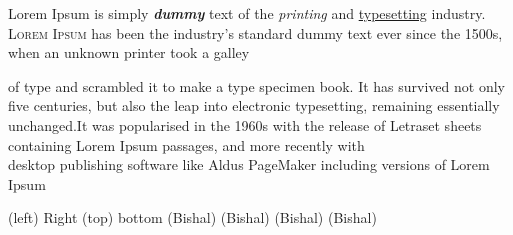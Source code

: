 \documentclass[12pt,a4paper]{article}
\begin{document}
\setlength{\parindent}{30pt}
Lorem Ipsum is simply \textbf{\textit{dummy}} text of the \textit{printing} and \underline{typesetting} industry. \textsc{Lorem Ipsum} has been the industry's \textmd{standard} dummy text ever since the 1500s, when an unknown printer took a galley  
\vfill

of type and scrambled it to make a \hfill type specimen book. It has survived not only five centuries, 
but also the leap into electronic typesetting, \textup{remaining} essentially unchanged.It was popularised in the 1960s with the release of Letraset sheets containing Lorem Ipsum passages, and more recently with \vspace{5cm}\\ desktop publishing software \hspace{5cm} like Aldus PageMaker including versions of Lorem Ipsum


\vspace{5cm}
\Large(left) \hfill \Large{Right}
\Large(top) \vfill \Large{bottom}
\small(Bishal)
\large(Bishal)
\Large(Bishal)
\LARGE(Bishal)
\end{document}
